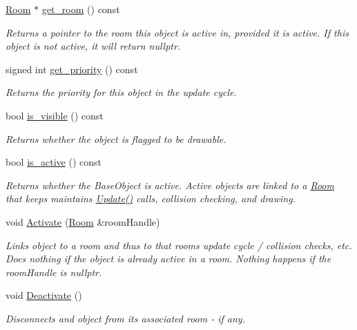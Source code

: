 \begin{DoxyCompactItemize}
\item 
\hyperlink{class_helios_1_1_room}{Room} $\ast$ \hyperlink{class_helios_1_1_base_obj_a896030076cb96c794f4b202cca0ec584}{get\+\_\+room} () const 
\begin{DoxyCompactList}\small\item\em Returns a pointer to the room this object is active in, provided it is active. If this object is not active, it will return nullptr. \end{DoxyCompactList}\item 
signed int \hyperlink{class_helios_1_1_base_obj_abf2a6d187e1c8329bb8e24256218aecb}{get\+\_\+priority} () const 
\begin{DoxyCompactList}\small\item\em Returns the priority for this object in the update cycle. \end{DoxyCompactList}\item 
bool \hyperlink{class_helios_1_1_base_obj_a418fb8f5e8aa25f0969e37e24cadb8c9}{is\+\_\+visible} () const 
\begin{DoxyCompactList}\small\item\em Returns whether the object is flagged to be drawable. \end{DoxyCompactList}\item 
bool \hyperlink{class_helios_1_1_base_obj_a8c748b30dca39c303e8bb9085f9d6d15}{is\+\_\+active} () const 
\begin{DoxyCompactList}\small\item\em Returns whether the Base\+Object is active. Active objects are linked to a \hyperlink{class_helios_1_1_room}{Room} that keeps maintains \hyperlink{class_helios_1_1_base_obj_aa42e26e872234b6871d159c29afdef17}{Update()} calls, collision checking, and drawing. \end{DoxyCompactList}\item 
void \hyperlink{class_helios_1_1_base_obj_a7823cb052c6c97f4aab120f6eb864392}{Activate} (\hyperlink{class_helios_1_1_room}{Room} \&room\+Handle)
\begin{DoxyCompactList}\small\item\em Links object to a room and thus to that room\textquotesingle{}s update cycle / collision checks, etc. Does nothing if the object is already active in a room. Nothing happens if the room\+Handle is nullptr. \end{DoxyCompactList}\item 
void \hyperlink{class_helios_1_1_base_obj_ade0a810a861f41a43adf0e7c766951d1}{Deactivate} ()
\begin{DoxyCompactList}\small\item\em Disconnects and object from its associated room -\/ if any. \end{DoxyCompactList}\item 

\end{DoxyCompactItemize}

